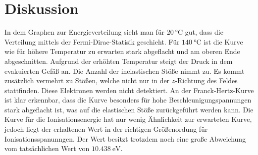 \section{Diskussion}
\label{sec:Diskussion}
In dem Graphen zur Energieverteilung sieht man für $\SI{20}{\degreeCelsius}$ gut, dass die Verteilung mittels der Fermi-Dirac-Statisik geschieht.
Für $\SI{140}{\degreeCelsius}$ ist die Kurve wie für höhere Temperatur zu erwarten stark abgeflacht und am oberen Ende abgeschnitten.
Aufgrund der erhöhten Temperatur steigt der Druck in dem evakuierten Gefäß an.
Die Anzahl der inelastischen Stöße nimmt zu.
Es kommt zusätzlich vermehrt zu Stößen, welche nicht nur in der $z$-Richtung des Feldes stattfinden.
Diese Elektronen werden nicht detektiert.
An der Franck-Hertz-Kurve ist klar erkennbar, dass die Kurve besonders für hohe Beschleunigungspannungen stark abgeflacht ist, was auf die elastischen Stöße zurückgeführt werden kann.
Die Kurve für die Ionisationsenergie hat nur wenig Ähnlichkeit zur erwarteten Kurve, jedoch liegt der erhaltenen Wert in der richtigen Größenordung für Ionisationsspanunngen.
Der Wert besitzt trotzdem noch eine große Abweichung vom tatsächlichen Wert von $\SI{10.438}{\electronvolt}$\cite{hg}.
